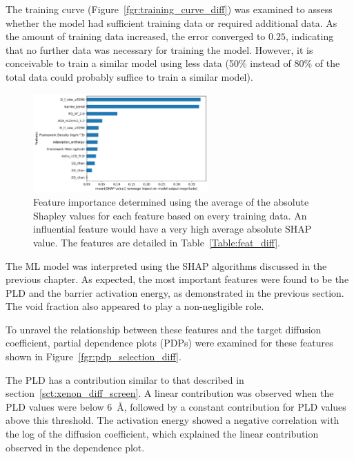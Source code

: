 \documentclass[main]{subfiles}
\begin{document}
The training curve (Figure~\ref{fgr:training_curve_diff}) was examined to assess whether the model had sufficient training data or required additional data. As the amount of training data increased, the error converged to $0.25$, indicating that no further data was necessary for training the model. However, it is conceivable to train a similar model using less data (50\% instead of 80\% of the total data could probably suffice to train a similar model).

\begin{figure}[ht]
  \centering
  \includegraphics[width=0.6\textwidth]{figures/5-diffusion/Diff_Feature_importance_shapbased.pdf}
  \caption{ Feature importance determined using the average of the absolute Shapley values for each feature based on every training data. An influential feature would have a very high average absolute SHAP value. The features are detailed in Table~\ref{Table:feat_diff}. }\label{fgr:feat_imp_diff}
\end{figure}

The ML model was interpreted using the SHAP algorithms discussed in the previous chapter. As expected, the most important features were found to be the PLD and the barrier activation energy, as demonstrated in the previous section. The void fraction also appeared to play a non-negligible role.

To unravel the relationship between these features and the target diffusion coefficient, partial dependence plots (PDPs) were examined for these features shown in Figure~\ref{fgr:pdp_selection_diff}. 

The PLD has a contribution similar to that described in section~\ref{sct:xenon_diff_screen}. A linear contribution was observed when the PLD values were below \SI{6}{\angstrom}, followed by a constant contribution for PLD values above this threshold. The activation energy showed a negative correlation with the log of the diffusion coefficient, which explained the linear contribution observed in the dependence plot.
\end{document}
